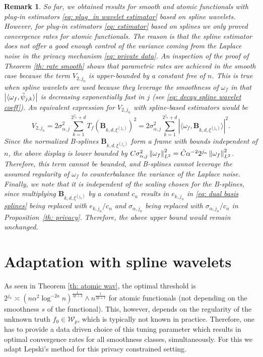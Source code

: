 \documentclass[preprint]{imsart}
\newcommand\norm[1]{\left\lVert#1\right\rVert}
\newtheorem{remark}[theorem]{Remark}
\numberwithin{equation}{section}
\begin{document}
\begin{remark}\normalfont
\label{rk: failure spline smooth}
    So far, we obtained results for smooth and atomic functionals with plug-in estimators \eqref{eq: plug_in wavelet estimator} based on spline wavelets. However, for plug-in estimators \eqref{eq: estimator} based on splines we only proved convergence rates for atomic functionals. The reason is that the spline estimator does not offer a good enough control of the variance coming from the Laplace noise in the privacy mechanism \eqref{eq: private data}. An inspection of the proof of Theorem \ref{th: rate smooth} shows that parametric rates are achieved in the smooth case because the term $V_{2,j_n}$ is upper-bounded by a constant free of $n$. This is true when spline wavelets are used because they leverage the smoothness of $\omega_f$ in that $\left|\langle \omega_f, \Tilde{\psi}_{j,k}\rangle\right|$ is decreasing exponentially fast in $j$ (see \eqref{eq: decay spline wavelet coeff}). An equivalent expression for $V_{2,j_n}$ with spline-based estimators would be
    \[V_{2,j_n}=2\sigma_{\alpha,j}^2\sum_{k=1}^{2^{j_n}+d} T_f(\mathbf{B}_{k,d,\xi^{(j_n)}})^2=2\sigma_{\alpha,j}^2\sum_{k=1}^{2^{j_n}+d} \left|\langle \omega_f, \mathbf{B}_{k,d,\xi^{(j_n)}}\rangle\right|^2.\]
    Since the normalized B-splines $\mathbf{B}_{k,d,\xi^{(j_n)}}$ form a frame with bounds independent of $n$, the above display is lower bounded by $C\sigma_{\alpha,j}^2\norm{\omega_f}_{L^2}^2=
    \Tilde{C}\alpha^{-2}2^{j_n}\norm{\omega_f}_{L^2}^2$. Therefore, this term cannot be bounded, and B-splines cannot leverage the assumed regularity of $\omega_f$ to counterbalance the variance of the Laplace noise. Finally, we note that it is independent of the scaling chosen for the B-splines, since multiplying $\mathbf{B}_{k,d,\xi^{(j_n)}}$ by a constant $c_n$ results in $e_{k,j_n}$ in \eqref{eq: dual basis splines} being replaced with $e_{k,j_n}/c_n$ and $\sigma_{\alpha,j_n}$ being replaced with $\sigma_{\alpha,j_n}/c_n$ in Proposition~\ref{th: privacy}. Therefore, the above upper bound would remain unchanged.
\end{remark}

\section{Adaptation with spline wavelets}
\label{sec:Adaptation}




As seen in Theorem \ref{th: atomic wav}, the optimal threshold is $2^{j_n}\asymp (n\alpha^2\log^{-2a}n)^{\frac{1}{2p+2}}\wedge n^{\frac{1}{2p+1}}$ for atomic functionals (not depending on the smoothness $s$ of the functional). This, however, depends on the regularity of the unknown truth $f_0\in \mathcal{W}_{p}$, which is typically not known in practice. Therefore, one has to provide a data driven choice of this tuning parameter which results in optimal convergence rates for all smoothness classes, simultaneously. For this we adapt Lepski's method for this privacy constrained setting.
\end{document}
